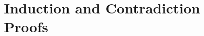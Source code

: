 \documentclass[../../main.tex]{subfiles}
\begin{document}
\chapter{Induction and Contradiction Proofs}
\end{document}
